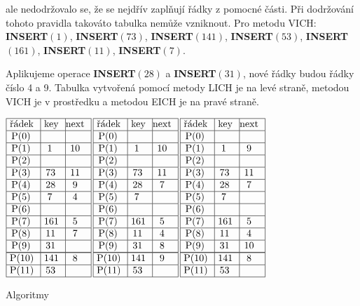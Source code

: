 \documentclass[a4paper,12pt]{article}
\begin{document}
ale nedodržovalo se, že se nejdřív zaplňují řádky z 
pomocné části.  Při dodržování tohoto pravidla takováto tabulka 
nemůže vznik\-nout.\newline 
Pro metodu VICH:\newline 
{\bf INSERT$(1)$}, {\bf INSERT$(73)$}, {\bf INSERT$(141)$}, 
{\bf INSERT$(53)$}, {\bf INSERT$(161)$},\newline 
{\bf INSERT$(11)$}, {\bf INSERT$(7)$}. 

Aplikujeme operace {\bf INSERT$(28)$} a {\bf INSERT$(31
)$}, nové řád\-ky 
budou řádky číslo 4 a 9. Tabulka vytvořená pomocí 
metody LICH je na levé straně, metodou VICH je v 
prostředku a metodou EICH je na pravé straně.

$\vbox {\hbox{\vtop{\offinterlineskip\halign{\strut\vrule\ # & \vrule\ # & \vrule\hfil # \hfil\vrule\cr\noalign{\hrule}řádek & key & next \hfil\cr\noalign{\hrule}P(0) & &\hfill \cr\noalign{\hrule}P(1) & 1 & 10 \cr\noalign{\hrule}P(2) & &\hfill \cr\noalign{\hrule}P(3) & 73 & 11 \cr\noalign{\hrule}P(4) & 28 & 9 \cr\noalign{\hrule}P(5) & 7 & 4 \cr\noalign{\hrule}P(6) &  &\hfill \cr\noalign{\hrule}P(7) & 161 & 5 \cr\noalign{\hrule}P(8) & 11 & 7 \cr\noalign{\hrule}P(9) & 31 &\hfill \cr\noalign{\hrule}\noalign{\hrule}P(10) & 141 & 8 \cr\noalign{\hrule}P(11) & 53 & \hfill \cr\noalign{\hrule}}}\,\vtop{\offinterlineskip\halign{\strut\vrule\ # & \vrule\ # & \vrule\hfil# \hfil\vrule\cr\noalign{\hrule}řádek & key & next \hfil\cr\noalign{\hrule}P(0) & &\hfill \cr\noalign{\hrule}P(1) & 1 & 10 \cr\noalign{\hrule}P(2) & &\hfill \cr\noalign{\hrule}P(3) & 73 & 11 \cr\noalign{\hrule}P(4) & 28 & 7 \cr\noalign{\hrule}P(5) & 7 & \hfill \cr\noalign{\hrule}P(6) &  &\hfill \cr\noalign{\hrule}P(7) & 161 & 5 \cr\noalign{\hrule}P(8) & 11 & 4 \cr\noalign{\hrule}P(9) & 31 & 8 \cr\noalign{\hrule}\noalign{\hrule}P(10) & 141 & 9 \cr\noalign{\hrule}P(11) & 53 & \hfill \cr\noalign{\hrule}}}\,\vtop{\offinterlineskip\halign {\strut\vrule\ # & \vrule\ # & \vrule \hfil # \hfil \vrule\cr\noalign{\hrule}řádek & key & next \hfil \cr\noalign{\hrule}P(0) & &\hfill \cr\noalign{\hrule}P(1) & 1 & 9 \cr\noalign{\hrule}P(2) & &\hfill \cr\noalign{\hrule}P(3) & 73 & 11 \cr\noalign{\hrule}P(4) & 28 & 7 \cr\noalign{\hrule}P(5) & 7 & \hfill \cr\noalign{\hrule}P(6) & & \hfill \cr\noalign{\hrule}P(7) & 161 & 5 \cr\noalign{\hrule}P(8) & 11 & 4  \cr\noalign{\hrule}P(9) & 31 & 10 \cr\noalign{\hrule}\noalign{\hrule}P(10) & 141 & 8 \cr\noalign{\hrule}P(11) & 53 & \hfill \cr\noalign{\hrule}}}}}$

\subhead
Algoritmy
\endsubhead
\end{document}
